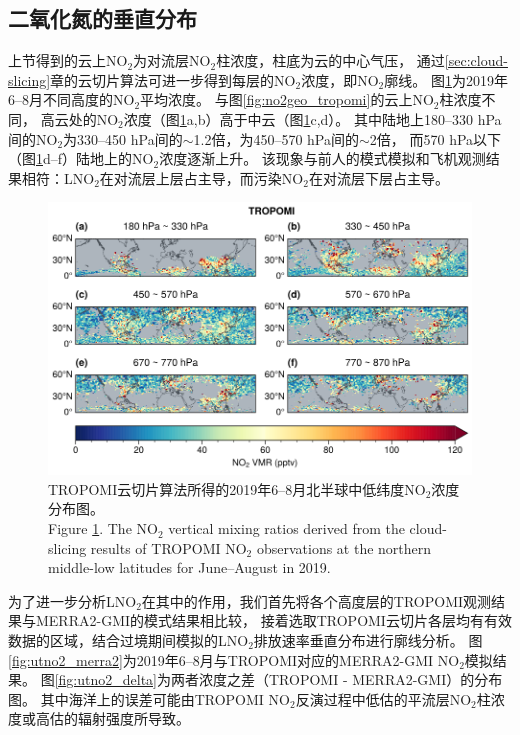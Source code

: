 \subsection{二氧化氮的垂直分布} \label{sec:no2_profile}


上节得到的云上NO$_2$为对流层NO$_2$柱浓度，柱底为云的中心气压，
通过\ref{sec:cloud-slicing}章的云切片算法可进一步得到每层的NO$_2$浓度，即NO$_2$廓线。
图\ref{fig:utno2_tropomi}为2019年6--8月不同高度的NO$_2$平均浓度。
与图\ref{fig:no2geo_tropomi}的云上NO$_2$柱浓度不同，
高云处的NO$_2$浓度（图\ref{fig:utno2_tropomi}a,b）高于中云（图\ref{fig:utno2_tropomi}c,d）。
其中陆地上180--330 hPa间的NO$_2$为330--450 hPa间的$\sim$1.2倍，为450--570 hPa间的$\sim$2倍，
而570 hPa以下（图\ref{fig:utno2_tropomi}d--f）陆地上的NO$_2$浓度逐渐上升。
该现象与前人的模式模拟和飞机观测结果相符：LNO$_2$在对流层上层占主导，而污染NO$_2$在对流层下层占主导\citep{Pickering.1996,Ott.2010,Laughner.2017}。


\begin{figure}[H]
    \centering
    \includegraphics[width=13cm]{./figures/utno2_tropomi.png}
    \caption{
    TROPOMI云切片算法所得的2019年6--8月北半球中低纬度NO$_2$浓度分布图。 \\
    Figure \ref{fig:utno2_tropomi}. The NO$_2$ vertical mixing ratios derived from the cloud-slicing results of TROPOMI NO$_2$ observations at the northern middle-low latitudes for June--August in 2019.
    }
    \label{fig:utno2_tropomi}
\end{figure}

为了进一步分析LNO$_2$在其中的作用，我们首先将各个高度层的TROPOMI观测结果与MERRA2-GMI的模式结果相比较，
接着选取TROPOMI云切片各层均有有效数据的区域，结合过境期间模拟的LNO$_2$排放速率垂直分布进行廓线分析。
图\ref{fig:utno2_merra2}为2019年6--8月与TROPOMI对应的MERRA2-GMI NO$_2$模拟结果。
图\ref{fig:utno2_delta}为两者浓度之差（TROPOMI - MERRA2-GMI）的分布图。
其中海洋上的误差可能由TROPOMI NO$_2$反演过程中低估的平流层NO$_2$柱浓度或高估的辐射强度所导致\citep{VanGeffen.2020}。

